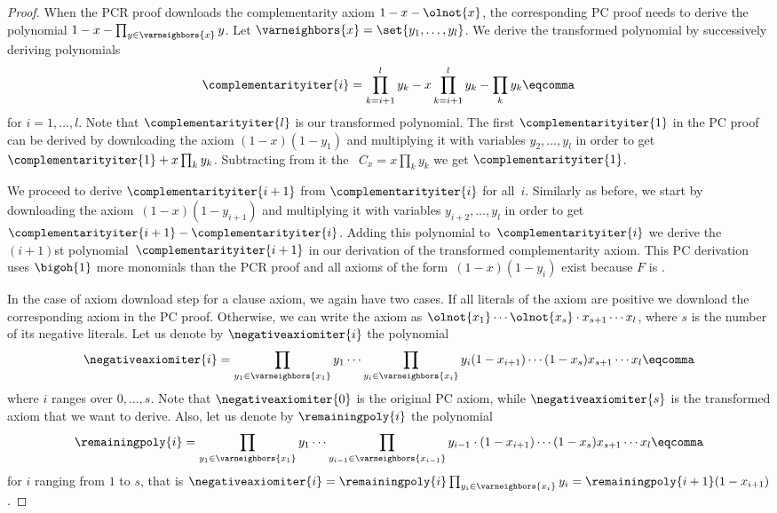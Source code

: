 \begin{proof}
  When the PCR proof downloads the complementarity axiom $1 - x -
  \olnot{x}$, the corresponding PC proof needs to derive the
  polynomial $1 - x - \prod_{y \in \varneighbors{x}} y$. Let
  $\varneighbors{x} = \set{y_1, \ldots, y_l}$. We derive the
  transformed polynomial by successively deriving polynomials
  \begin{equation}
    \complementarityiter{i} = \prod_{k = i + 1}^l y_k - x \prod_{k = i + 1}^l y_k - \prod_k y_k \eqcomma
  \end{equation}
  for $i = 1, \ldots, l$. Note that $\complementarityiter{l}$ is our
  transformed polynomial. The first $\complementarityiter{1}$ in the
  PC proof can be derived by downloading the axiom $(1 - x)(1 - y_1)$
  and multiplying it with variables $y_2, \ldots, y_l$ in order to get
  $\complementarityiter{1} + x \prod_k y_k$. Subtracting from it
  the~ $C_x = x \prod_k y_k$ we get
  $\complementarityiter{1}$.


  We proceed to derive $\complementarityiter{i + 1}$ from
  $\complementarityiter{i}$ for all~$i$. Similarly as before, we start
  by downloading the axiom~$(1 - x)(1 - y_{i + 1})$ and multiplying it
  with variables $y_{i + 2}, \ldots, y_l$ in order to get
  $\complementarityiter{i + 1} - \complementarityiter{i}$. Adding this
  polynomial to~$\complementarityiter{i}$ we derive the $(i + 1)$st
  polynomial~$\complementarityiter{i + 1}$ in our derivation of the
  transformed complementarity axiom. This PC derivation uses
  $\bigoh{1}$ more monomials than the PCR proof and all axioms of the
  form~$(1 - x)(1 - y_i)$ exist because $F$ is
  \varweightconstrained{}.

  In the case of axiom download step for a clause axiom, we again have
  two cases. If all literals of the axiom are positive we download the
  corresponding axiom in the PC proof. Otherwise, we can write the
  axiom as $\olnot{x_1} \cdots \olnot{x_s} \cdot x_{s + 1} \cdots
  x_l$, where $s$ is the number of its negative literals.
  Let us denote by $\negativeaxiomiter{i}$
  the polynomial
  \begin{equation}
    \negativeaxiomiter{i} = \prod_{y_1 \in \varneighbors{x_1}} y_1 \cdots \prod_{y_i \in
      \varneighbors{x_i}} y_i (1 - x_{i + 1}) \cdots (1 - x_s) x_{s + 1} \cdots x_l \eqcomma
  \end{equation}
  where $i$ ranges over $0, \ldots, s$. Note that
  $\negativeaxiomiter{0}$ is the original PC axiom, while
  $\negativeaxiomiter{s}$ is the transformed axiom that we want to
  derive. Also, let us denote by $\remainingpoly{i}$ the polynomial
  \begin{equation}
    \remainingpoly{i} = \prod_{y_1 \in \varneighbors{x_1}} y_1 \cdots \prod_{y_{i - 1} \in \varneighbors{x_{i - 1}}} y_{i - 1} \cdot (1 - x_{i + 1}) \cdots (1 - x_s) x_{s + 1} \cdots x_l \eqcomma
  \end{equation}
  for $i$ ranging from $1$ to $s$, that is $\negativeaxiomiter{i} =
  \remainingpoly{i} \prod_{y_i \in \varneighbors{x_i}} y_i =
  \remainingpoly{i + 1} (1 - x_{i + 1})$.


\end{proof}
